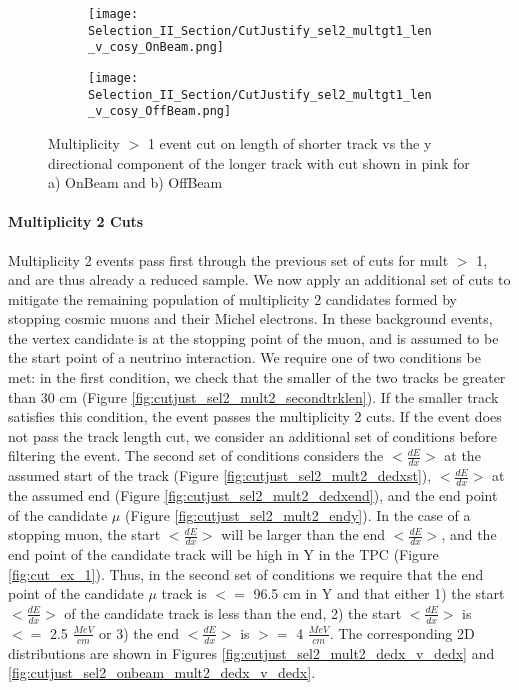 \documentclass{article}
\begin{document}
\begin{figure}[t!]
\centering
  \begin{subfigure}[t]{0.25\textwidth}
    \centering
\texttt{[image: Selection\_II\_Section/CutJustify\_sel2\_multgt1\_len\_v\_cosy\_OnBeam.png]}
 \caption{ }
  \end{subfigure} 
  \hspace{20mm}
  \begin{subfigure}[t]{0.25\textwidth}
    \centering
  \texttt{[image: Selection\_II\_Section/CutJustify\_sel2\_multgt1\_len\_v\_cosy\_OffBeam.png]}
   \caption{ }
  \end{subfigure} 
\caption{ Multiplicity $>$ 1 event cut on length of shorter track vs the y directional component of the longer track with cut shown in pink for a) OnBeam and b) OffBeam }
\label{fig:cutjust_sel2_onbeam_multgt1_len_v_cosy}
\end{figure}

\clearpage
\paragraph{Multiplicity 2 Cuts}
Multiplicity 2 events pass first through the previous set of cuts for mult $>$ 1, and are thus already a reduced sample. We now apply an additional set of cuts to mitigate the remaining population of multiplicity 2 candidates formed by stopping cosmic muons and their Michel electrons. In these background events, the vertex candidate is at the stopping point of the muon, and is assumed to be the start point of a neutrino interaction. We require one of two conditions be met: in the first condition, we check that the smaller of the two tracks be greater than 30 cm (Figure \ref{fig:cutjust_sel2_mult2_secondtrklen}). If the smaller track satisfies this condition, the event passes the multiplicity 2 cuts. If the event does not pass the track length cut, we consider an additional set of conditions before filtering the event.  The second set of conditions considers the $<\frac{dE}{dx}>$ at the assumed start of the track (Figure \ref{fig:cutjust_sel2_mult2_dedxst}), $<\frac{dE}{dx}>$ at the assumed end (Figure \ref{fig:cutjust_sel2_mult2_dedxend}), and the end point of the candidate $\mu$ (Figure \ref{fig:cutjust_sel2_mult2_endy}).  In the case of a stopping muon, the start $<\frac{dE}{dx}>$ will be larger than the end $<\frac{dE}{dx}>$, and the end point of the candidate track will be high in Y in the TPC (Figure \ref{fig:cut_ex_1}).  Thus, in the second set of conditions we require that the end point of the candidate $\mu$ track is $<=$ 96.5 cm in Y and that either 1) the start $<\frac{dE}{dx}>$ of the candidate track is less than the end, 2) the start $<\frac{dE}{dx}>$ is $<=$ 2.5 $\frac{MeV}{cm}$ or 3) the end $<\frac{dE}{dx}>$ is $>=$ 4 $\frac{MeV}{cm}$. The corresponding 2D distributions are shown in Figures \ref{fig:cutjust_sel2_mult2_dedx_v_dedx} and \ref{fig:cutjust_sel2_onbeam_mult2_dedx_v_dedx}.
\end{document}
